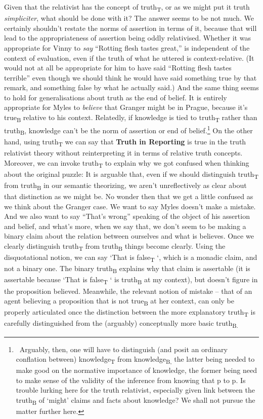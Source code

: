 Given that the relativist has the concept of truth\textsubscript{T}, or as we might put it truth \textit{simpliciter}, what should be done with it? The answer seems to be not much. We certainly shouldn't restate the norms of assertion in terms of it, because that will lead to the appropriateness of assertion being oddly relativised. Whether it was appropriate for Vinny to \textit{say} ``Rotting flesh tastes great,'' is independent of the context of evaluation, even if the truth of what he uttered is context-relative. (It would not at all be appropriate for him to have said ``Rotting flesh tastes terrible'' even though we should think he would have said something true by that remark, and something false by what he actually said.) And the same thing seems to hold for generalisations about truth as the end of belief. It is entirely appropriate for Myles to \textit{believe} that Granger might be in Prague, because it's true\textsubscript{B} relative to his context. Relatedly, if knowledge is tied to truth\textsubscript{T} rather than truth\textsubscript{B}, knowledge can't be the norm of assertion or end of belief.\footnote{\ Arguably, then, one will have to distinguish (and posit an ordinary conflation between) knowledge\textsubscript{T} from knowledge\textsubscript{B, }the latter being needed to make good on the normative importance of knowledge, the former being need to make sense of the validity of the inference from knowing that p to p. Is trouble lurking here for the truth relativist, especially given link between the truth\textsubscript{B }of `might' claims and facts about knowledge? We shall not pursue the matter further here. } On the other hand, using truth\textsubscript{T} we can say that \textbf{Truth in Reporting} is true in the truth relativist theory without reinterpreting it in terms of relative truth concepts. Moreover, we can invoke truth\textsubscript{T }to explain why we got confused when thinking about the original puzzle: It is arguable that, even if we should distinguish truth\textsubscript{T} from truth\textsubscript{B }in our semantic theorizing, we aren't unreflectively as clear about that distinction as we might be. No wonder then that we get a little confused as we think about the Granger case. We want to say Myles doesn't make a mistake. And we also want to say ``That's wrong'' speaking of the object of his assertion and belief, and what's more, when we say that, we don't seem to be making a binary claim about the relation between ourselves and what is believes. Once we clearly distinguish truth\textsubscript{T} from truth\textsubscript{B }things become clearly. Using the disquotational notion, we can say `That is false\textsubscript{T }`, which is a monadic claim, and not a binary one. The binary truth\textsubscript{B }explains why that claim is assertable (it is assertable because `That is false\textsubscript{T} ` is truth\textsubscript{B }at my context), but doesn't figure in the proposition believed. Meanwhile, the relevant notion of mistake -- that of an agent believing a proposition that is not true\textsubscript{B }at her context, can only be properly articulated once the distinction between the more explanatory truth\textsubscript{T} is carefully distinguished from the (arguably) conceptually more basic truth\textsubscript{B.}
 
